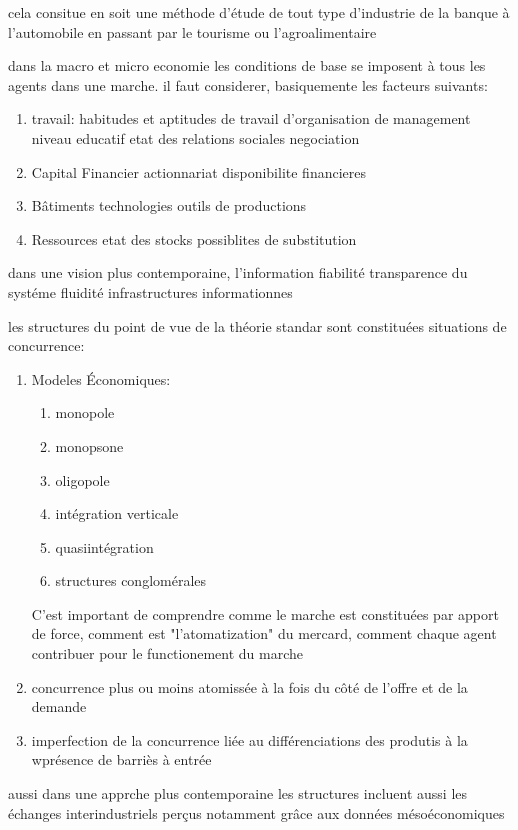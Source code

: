 \documentclass{article}
\begin{document}
cela consitue en soit une méthode d'étude de tout type d'industrie de la banque à l'automobile en passant par le tourisme ou l'agroalimentaire


dans la macro et micro economie 
les conditions de base se imposent à tous les agents dans une marche. il faut considerer, basiquemente les facteurs suivants:
\begin{enumerate}
    \item travail: 
        habitudes et aptitudes de travail d'organisation
        de management
        niveau educatif
        etat des relations sociales
        negociation
    \item Capital Financier
        actionnariat
        disponibilite financieres
    \item Bâtiments
        technologies
        outils de productions
    \item Ressources
        etat des stocks
        possiblites de substitution
\end{enumerate}

dans une vision plus contemporaine, l'information fiabilité transparence du systéme fluidité infrastructures informationnes

les structures du point de vue de la théorie standar sont constituées situations de concurrence:
\begin{enumerate}
    \item Modeles Économiques:
    \begin{enumerate}
        \item monopole
        \item monopsone
        \item oligopole
        \item intégration verticale
        \item quasiintégration
        \item structures conglomérales
    \end{enumerate}
    C'est important de comprendre comme le marche est constituées par apport de force, comment est "l'atomatization" du mercard, comment chaque agent contribuer pour le functionement du marche
    \item concurrence plus ou moins atomissée à la fois du côté de l'offre et de la demande
    \item imperfection de la concurrence liée au différenciations des produtis à la wprésence de barriès à entrée
\end{enumerate}
aussi dans une apprche plus contemporaine les structures incluent aussi les échanges interindustriels perçus notamment grâce aux données mésoéconomiques
\end{document}
